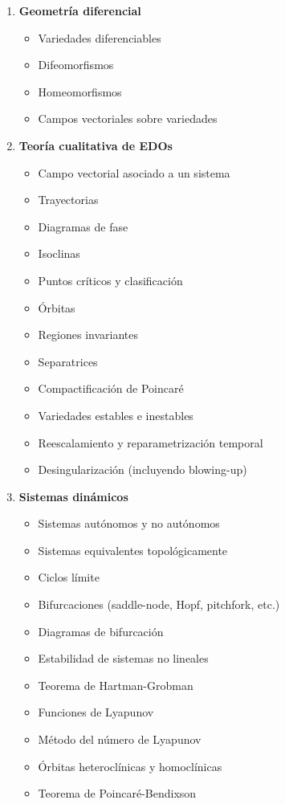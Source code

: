 \begin{enumerate}
	\item \textbf{Geometría diferencial}
	\begin{itemize}
		\item Variedades diferenciables
		\item Difeomorfismos
		\item Homeomorfismos
		\item Campos vectoriales sobre variedades
	\end{itemize}
	
	\item \textbf{Teoría cualitativa de EDOs}
	\begin{itemize}
		\item Campo vectorial asociado a un sistema \checkmark
		\item Trayectorias \checkmark
		\item Diagramas de fase \checkmark
		\item Isoclinas \checkmark
		\item Puntos críticos y clasificación \checkmark
		\item Órbitas
		\item Regiones invariantes
		\item Separatrices
		\item Compactificación de Poincaré
		\item Variedades estables e inestables
		\item Reescalamiento y reparametrización temporal
		\item Desingularización (incluyendo blowing-up)
	\end{itemize}
	
	\item \textbf{Sistemas dinámicos}
	\begin{itemize}
		\item Sistemas autónomos y no autónomos \checkmark
		\item Sistemas equivalentes topológicamente
		\item Ciclos límite
		\item Bifurcaciones (saddle-node, Hopf, pitchfork, etc.)
		\item Diagramas de bifurcación \checkmark
		\item Estabilidad de sistemas no lineales
		\item Teorema de Hartman-Grobman \checkmark
		\item Funciones de Lyapunov
		\item Método del número de Lyapunov
		\item Órbitas heteroclínicas y homoclínicas
		\item Teorema de Poincaré-Bendixson
	\end{itemize}
	

\end{enumerate}
